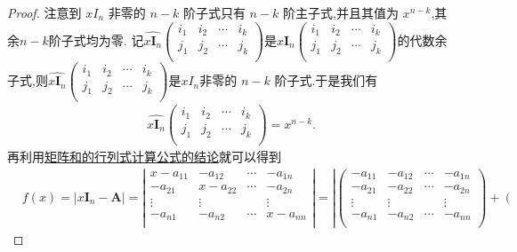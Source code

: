 \documentclass[../../main.tex]{subfiles}%
\begin{document}
\begin{proof}
注意到 \(xI_{n}\) 非零的 \(n - k\) 阶子式只有 \(n - k\) 阶主子式,并且其值为 \(x^{n - k}\),其余$n-k$阶子式均为零.
记$\widehat{x\boldsymbol{I}_n}\left( \begin{matrix}
i_1&		i_2&		\cdots&		i_k\\
j_1&		j_2&		\cdots&		j_k\\
\end{matrix} \right)$是$x\boldsymbol{I}_n\left( \begin{matrix}
i_1&		i_2&		\cdots&		i_k\\
j_1&		j_2&		\cdots&		j_k\\
\end{matrix} \right)$的代数余子式,则$\widehat{x\boldsymbol{I}_n}\left( \begin{matrix}
i_1&		i_2&		\cdots&		i_k\\
j_1&		j_2&		\cdots&		j_k\\
\end{matrix} \right)$是\(xI_{n}\)非零的 \(n - k\) 阶子式.于是我们有
\begin{align*}
\widehat{x\boldsymbol{I}_n}\left( \begin{matrix}
i_1&		i_2&		\cdots&		i_k\\
j_1&		j_2&		\cdots&		j_k\\
\end{matrix} \right) =x^{n-k}.
\end{align*}
再利用\hyperref[proposition:矩阵和的行列式计算公式]{矩阵和的行列式计算公式的结论}就可以得到
\begin{align*}
&f(x)=|x\boldsymbol{I}_n-\boldsymbol{A}|=\left| \begin{matrix}
x-a_{11}&		-a_{12}&		\cdots&		-a_{1n}\\
-a_{21}&		x-a_{22}&		\cdots&		-a_{2n}\\
\vdots&		\vdots&		&		\vdots\\
-a_{n1}&		-a_{n2}&		\cdots&		x-a_{nn}\\
\end{matrix} \right|=\left| \left( \begin{matrix}
-a_{11}&		-a_{12}&		\cdots&		-a_{1n}\\
-a_{21}&		-a_{22}&		\cdots&		-a_{2n}\\
\vdots&		\vdots&		&		\vdots\\
-a_{n1}&		-a_{n2}&		\cdots&		-a_{nn}\\
\end{matrix} \right) +\left( \begin{matrix}

\end{matrix}
\end{align*}
\end{proof}
\end{document}
